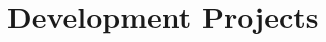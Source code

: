 \documentclass[11pt,a4paper,sans]{moderncv}
\begin{document}

\section{Development Projects}



\end{document}
